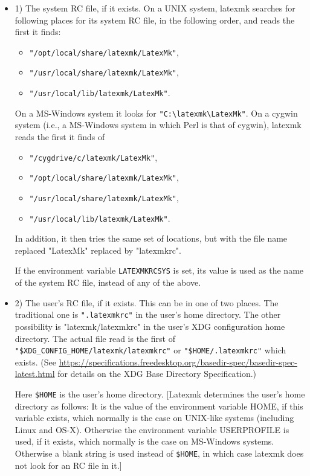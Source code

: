 \begin{itemize}
	\item 1) The system RC file, if it exists.
On a UNIX system, latexmk searches for following places for its system RC file, in the following order, and reads the first it finds:
\begin{itemize}
  \item \verb|"/opt/local/share/latexmk/LatexMk"|,
  \item \verb|"/usr/local/share/latexmk/LatexMk"|,
  \item \verb|"/usr/local/lib/latexmk/LatexMk"|.
\end{itemize}

On a MS-Windows system it looks for \verb|"C:\latexmk\LatexMk"|.  On a cygwin
system (i.e., a MS-Windows system in which Perl is  that of
cygwin), latexmk reads the first it finds of

\begin{itemize}
  \item \verb|"/cygdrive/c/latexmk/LatexMk"|,
  \item \verb|"/opt/local/share/latexmk/LatexMk"|,
  \item \verb|"/usr/local/share/latexmk/LatexMk"|,
  \item \verb|"/usr/local/lib/latexmk/LatexMk"|.
\end{itemize}

In addition, it then tries the same set of locations, but with the file
name replaced "LatexMk" replaced by "latexmkrc".

If the environment variable \verb|LATEXMKRCSYS| is set, its value is  used  as
the name of the system RC file, instead of any of the above.

	\item 2) The user's RC file, if it exists.  This can be in one of two places.
The traditional one is \verb|".latexmkrc"| in the user's home
directory.   The other  possibility  is "latexmk/latexmkrc" in
the user's XDG configuration home directory.  The actual file
read is the first  of
\verb|"$XDG_CONFIG_HOME/latexmk/latexmkrc"|  or
\verb|"$HOME/.latexmkrc"| which exists.  (See
\url{https://specifications.freedesktop.org/basedir-spec/basedir-spec-latest.html}
for details on the XDG Base Directory Specification.)

Here  \verb|$HOME|  is  the  user's  home  directory.  [Latexmk determines the
user's home directory as follows:  It is the value of  the
environment variable  HOME,  if this variable exists, which
normally is the case on UNIX-like systems (including Linux and
OS-X).  Otherwise  the  environment  variable USERPROFILE is
used, if it exists, which normally is the case on MS-Windows
systems. Otherwise a blank string is used instead of \verb|$HOME|, in
which case latexmk does not look for an RC file in it.]


\end{itemize}
